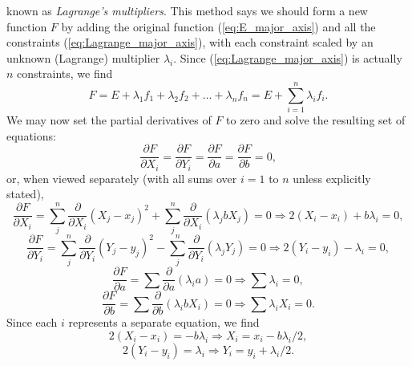 known as \emph{Lagrange's multipliers}.  This method says we should form a new function $F$ by adding the 
original function (\ref{eq:E_major_axis}) and all the constraints (\ref{eq:Lagrange_major_axis}), with each constraint scaled by an unknown 
(Lagrange) multiplier $\lambda _i$.  Since (\ref{eq:Lagrange_major_axis}) is actually $n$ constraints, we find
\begin{equation}
F = E + \lambda_1 f_1 + \lambda_2 f_2 + \ldots + \lambda_n f_n = E + \sum ^n _{i=1} \lambda_i f_i.
\label{eq:MA_partials}
\end{equation}	 
We may now set the partial derivatives of $F$ to zero and solve the resulting set of equations:
\begin{equation}
\frac{\partial F}{\partial X_i} = \frac{\partial F}{\partial Y_i} = \frac{\partial F}{\partial a} = \frac{\partial F}{\partial b} = 0,
\end{equation}
or, when viewed separately (with all sums over $i = 1$ to $n$ unless explicitly stated), 
\begin{equation}
\frac{\partial F}{\partial X_i} = \sum_j^n \frac{\partial}{\partial X_i} ( X_j - x_j)^2  + \sum_j^n \frac{\partial}{\partial X_i}
(\lambda_j bX_j) = 0 \Rightarrow 2(X_i - x_i) + b \lambda_i = 0,
\end{equation}
\begin{equation}
\frac{\partial F}{\partial Y_i} = \sum_j^n \frac{\partial}{\partial Y_i} ( Y_j - y_j)^2  - \sum_j^n \frac{\partial}{\partial Y_i}
(\lambda_j Y_j) = 0  \Rightarrow 2(Y_i - y_i) -  \lambda_i = 0,
\end{equation}
\begin{equation}
\frac{\partial F}{\partial a} = \sum  \frac{\partial}{\partial a} (\lambda_i a) = 0  \Rightarrow \sum \lambda_i  = 0,
\label{eq:lambda_major}
\end{equation}
\begin{equation}
\frac{\partial F}{\partial b} = \sum \frac{\partial}{\partial b}(\lambda_i bX_i) = 0  \Rightarrow \sum \lambda_i X_i = 0.
\label{eq:lambda_x_major}
\end{equation}
Since each $i$ represents a separate equation, we find
\begin{equation}
2(X_i - x_i) = -b \lambda_i \Rightarrow X_i = x_i - b \lambda_i/2,
\label{eq:Xisolution}
\end{equation}
\begin{equation}
2(Y_i - y_i) = \lambda_i \Rightarrow Y_i = y_i + \lambda_i/2.
\end{equation}	 
